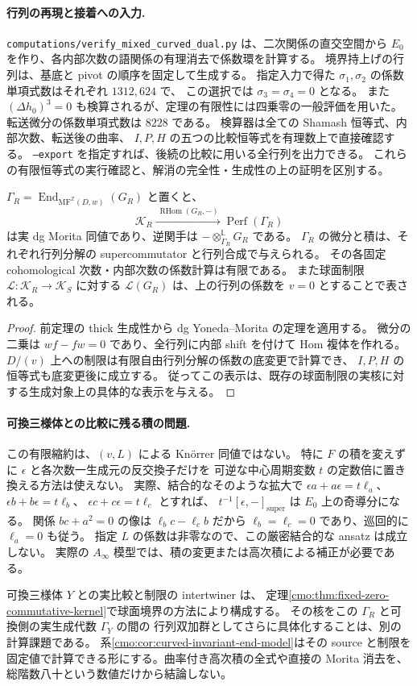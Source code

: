 \paragraph{行列の再現と接着への入力.}
\texttt{computations/verify\_mixed\_curved\_dual.py} は、二次関係の直交空間から
$E_0$ を作り、各内部次数の語関係の有理消去で係数環を計算する。
境界持上げの行列は、基底と pivot の順序を固定して生成する。
指定入力で得た $\sigma_1,\sigma_2$ の係数単項式数はそれぞれ $1312,624$ で、
この選択では $\sigma_3=\sigma_4=0$ となる。
また $(\Delta h_0)^3=0$ も検算されるが、定理の有限性には四乗零の一般評価を用いた。
転送微分の係数単項式数は $8228$ である。
検算器は全ての Shamash 恒等式、内部次数、転送後の曲率、
$I,P,H$ の五つの比較恒等式を有理数上で直接確認する。
\texttt{--export} を指定すれば、後続の比較に用いる全行列を出力できる。
これらの有限恒等式の実行確認と、解消の完全性・生成性の上の証明を区別する。

\begin{corollary}[実 dg 模型と制限核]
\label{cmo:cor:curved-invariant-end-model}
$\Gamma_R=\operatorname{End}_{\mathrm{MF}^{\mathbb Z}(D,w)}(G_R)$ と置くと、
\[
 \mathcal K_R\xrightarrow{\ \operatorname{RHom}(G_R,-)\ }
 \operatorname{Perf}(\Gamma_R)
\]
は実 dg Morita 同値であり、逆関手は $-\otimes_{\Gamma_R}^{\mathbb L}G_R$ である。
$\Gamma_R$ の微分と積は、それぞれ行列分解の supercommutator と行列合成で与えられる。
その各固定 cohomological 次数・内部次数の係数計算は有限である。
また球面制限 $\mathcal L:\mathcal K_R\to\mathcal K_S$ に対する
$\mathcal L(G_R)$ は、上の行列の係数を $v=0$ とすることで表される。
\end{corollary}

\begin{proof}
前定理の thick 生成性から dg Yoneda--Morita の定理を適用する。
微分の二乗は $wf-fw=0$ であり、全行列に内部 shift を付けて Hom 複体を作れる。
$D/(v)$ 上への制限は有限自由行列分解の係数の底変更で計算でき、
$I,P,H$ の恒等式も底変更後に成立する。
従ってこの表示は、既存の球面制限の実核に対する生成対象上の具体的な表示を与える。
\end{proof}

\paragraph{可換三様体との比較に残る積の問題.}
この有限縮約は、$(v,L)$ による Kn\"orrer 同値ではない。
特に $F$ の積を変えずに $\epsilon$ と各次数一生成元の反交換子だけを
可逆な中心周期変数 $t$ の定数倍に置き換える方法は使えない。
実際、結合的なそのような拡大で
$\epsilon a+a\epsilon=t\ell_a$、
$\epsilon b+b\epsilon=t\ell_b$、
$\epsilon c+c\epsilon=t\ell_c$ とすれば、
$t^{-1}[\epsilon,-]_{\mathrm{super}}$ は $E_0$ 上の奇導分になる。
関係 $bc+a^2=0$ の像は $\ell_b c-\ell_c b$ だから
$\ell_b=\ell_c=0$ であり、巡回的に $\ell_a=0$ も従う。
指定 $L$ の係数は非零なので、この厳密結合的な ansatz は成立しない。
実際の $A_\infty$ 模型では、積の変更または高次積による補正が必要である。

可換三様体 $Y$ との実比較と制限の intertwiner は、
定理\ref{cmo:thm:fixed-zero-commutative-kernel}で球面境界の方法により構成する。
その核をこの $\Gamma_R$ と可換側の実生成代数 $\Gamma_Y$ の間の
行列双加群としてさらに具体化することは、別の計算課題である。
系\ref{cmo:cor:curved-invariant-end-model}はその source と制限を
固定値で計算できる形にする。曲率付き高次積の全式や直接の Morita 消去を、
総階数八十という数値だけから結論しない。
